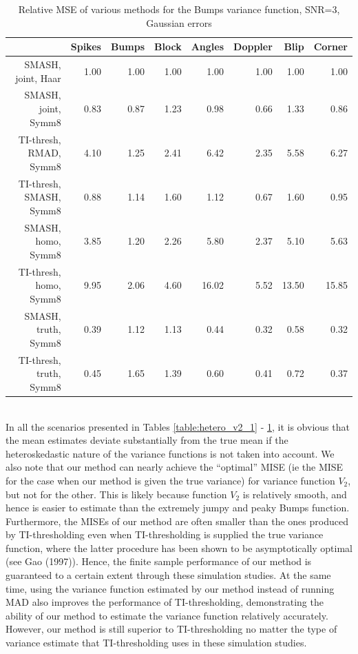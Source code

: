 \documentclass[12pt]{article}
\begin{document}
\begin{table}[ht]
\centering
\begin{tabular}{rrrrrrrr}
  \hline
 & Spikes & Bumps & Block & Angles & Doppler & Blip & Corner \\
  \hline
SMASH, joint, Haar & 1.00 & 1.00 & 1.00 & 1.00 & 1.00 & 1.00 & 1.00 \\
  SMASH, joint, Symm8 & 0.83 & 0.87 & 1.23 & 0.98 & 0.66 & 1.33 & 0.86 \\
  TI-thresh, RMAD, Symm8 & 4.10 & 1.25 & 2.41 & 6.42 & 2.35 & 5.58 & 6.27 \\
  TI-thresh, SMASH, Symm8 & 0.88 & 1.14 & 1.60 & 1.12 & 0.67 & 1.60 & 0.95 \\
  SMASH, homo, Symm8 & 3.85 & 1.20 & 2.26 & 5.80 & 2.37 & 5.10 & 5.63 \\
  TI-thresh, homo, Symm8 & 9.95 & 2.06 & 4.60 & 16.02 & 5.52 & 13.50 & 15.85 \\
  SMASH, truth, Symm8 & 0.39 & 1.12 & 1.13 & 0.44 & 0.32 & 0.58 & 0.32 \\
  TI-thresh, truth, Symm8 & 0.45 & 1.65 & 1.39 & 0.60 & 0.41 & 0.72 & 0.37 \\
   \hline
\end{tabular}
\caption{Relative MSE of various methods for the Bumps variance function, SNR=3, Gaussian errors}
\label{table:hetero_bump_3}
\end{table}
\bigskip\\
In all the scenarios presented in Tables \ref{table:hetero_v2_1} - \ref{table:hetero_bump_3}, it is obvious that the mean estimates deviate substantially from the true mean if the heteroskedastic nature of the variance functions is not taken into account. We also note that our method can nearly achieve the ``optimal'' MISE (ie the MISE for the case when our method is given the true variance) for variance function $V_2$, but not for the other. This is likely because function $V_2$ is relatively smooth, and hence is easier to estimate than the extremely jumpy and peaky Bumps function. Furthermore, the MISEs of our method are often smaller than the ones produced by TI-thresholding even when TI-thresholding is supplied the true variance function, where the latter procedure has been shown to be asymptotically optimal (see Gao (1997)). Hence, the finite sample performance of our method is guaranteed to a certain extent through these simulation studies. At the same time, using the variance function estimated by our method instead of running MAD also improves the performance of TI-thresholding, demonstrating the ability of our method to estimate the variance function relatively accurately. However, our method is still superior to TI-thresholding no matter the type of variance estimate that TI-thresholding uses in these simulation studies.\bigskip\\
\end{document}
